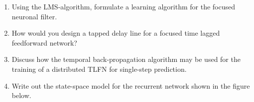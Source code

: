 \documentclass[10pt]{article}
\begin{document}
\begin{enumerate}
\vspace{2mm}


\vspace{2mm}

\item Using the LMS-algorithm, formulate a learning algorithm for the
  focused neuronal filter.

\vspace{2mm}

\item How would you design a tapped delay line for a focused time
  lagged feedforward network?

\vspace{2mm}

\item Discuss how the temporal back-propagation algorithm may be used for the
  training of a distributed TLFN for single-step prediction.



%
%
%
\vspace{2mm}

\item Write out the state-space model for the recurrent network shown in the
  figure below.


\end{enumerate}
\end{document}
